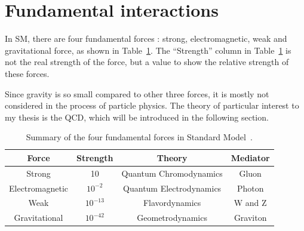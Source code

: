 

\section{Fundamental interactions}

In SM, there are four fundamental forces : strong, electromagnetic,  weak and 
gravitational force, as shown in Table~\ref{table:fourForces}. The ``Strength'' column 
in Table~\ref{table:fourForces} is not the real strength of the force, 
but a value to show the relative strength of these forces. 
 
Since gravity is so small compared to other three forces, it is mostly not considered in 
the process of particle physics. 
The theory of particular interest to my thesis 
is the QCD, which will be introduced in the following section.  

\begin{table}
\begin{tabular}{cccc}
Force & Strength & Theory & Mediator \\
\hline 
Strong  & 10 &  Quantum Chromodynamics  & Gluon \\
Electromagnetic & $10^{-2}$ & Quantum Electrodynamics & Photon \\
Weak & $10^{-13}$ & Flavordynamics & W and Z \\
Gravitational & $10^{-42}$ & Geometrodynamics & Graviton \\
\hline 
\end{tabular}
\caption{Summary of the four fundamental forces in Standard Model~\cite{particlebook1}.}
\label{table:fourForces}
\end{table} 





